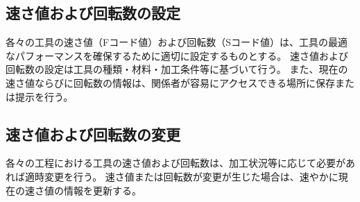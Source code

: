 
\subsection{速さ値および回転数の設定}
各々の工具の速さ値（Fコード値）および回転数（Sコード値）は、工具の最適なパフォーマンスを確保するために適切に設定するものとする。
速さ値および回転数の設定は工具の種類・材料・加工条件等に基づいて行う。
また、現在の速さ値ならびに回転数の情報は、関係者が容易にアクセスできる場所に保存または提示を行う。

\subsection{速さ値および回転数の変更}
各々の工程における工具の速さ値および回転数は、加工状況等に応じて必要があれば適時変更を行う。
速さ値または回転数が変更が生じた場合は、速やかに現在の速さ値の情報を更新する。
